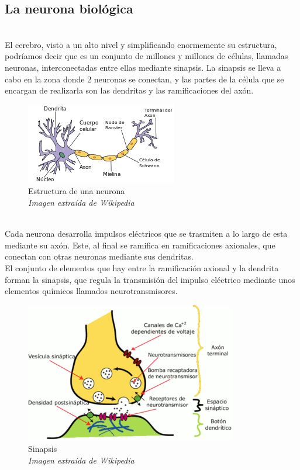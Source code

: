 \subsection {La neurona biológica} \mbox{}\\
El cerebro, visto a un alto nivel y simplificando enormemente su estructura, podríamos decir que es un conjunto de millones y millones de células, llamadas neuronas, interconectadas entre ellas mediante sinapsis. La sinapsis se lleva a cabo en la zona donde 2 neuronas se conectan, y las partes de la célula que se encargan de realizarla son las dendritas y las ramificaciones del axón.
\begin{figure}[htp]
\centering
\includegraphics[scale=0.6]{images/neurona.png}
\caption{Estructura de una neurona\\\textit{Imagen extraída de Wikipedia}}
\end{figure}\\
Cada neurona desarrolla impulsos eléctricos que se trasmiten a lo largo de esta mediante su axón. Este, al final se ramifica en ramificaciones axionales, que conectan con otras neuronas mediante sus dendritas.\\
El conjunto de elementos que hay entre la ramificación axional y la dendrita forman la sinapsis, que regula la transmisión del impulso eléctrico mediante unos elementos químicos llamados neurotransmisores.
\begin{figure}[htp]
\centering
\includegraphics[scale=0.50]{images/sinapsis.png}
\caption{Sinapsis\\\textit{Imagen extraída de Wikipedia}}
\end{figure}\\
